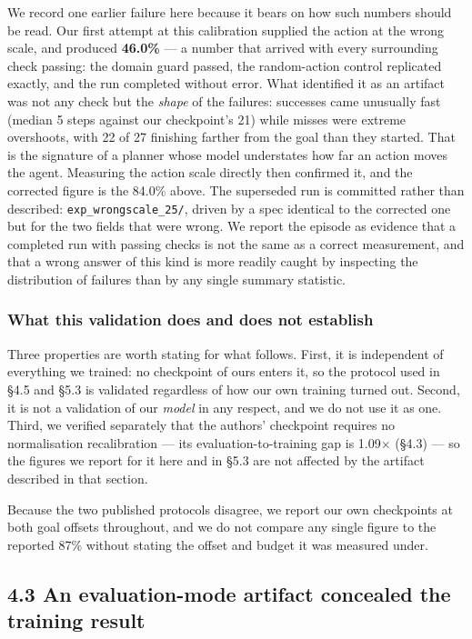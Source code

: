 \documentclass[10pt]{article}
\begin{document}
We record one earlier failure here because it bears on how such numbers should
be read. Our first attempt at this calibration supplied the action at the wrong
scale, and produced \textbf{46.0\%} --- a number that arrived with every surrounding
check passing: the domain guard passed, the random-action control replicated
exactly, and the run completed without error. What identified it as an artifact
was not any check but the \emph{shape} of the failures: successes came unusually fast (median 5 steps against our checkpoint's 21) while misses were extreme overshoots, with 22 of 27 finishing farther from the goal than they started.
That is the signature of a planner whose model understates how far an action
moves the agent. Measuring the action scale directly then confirmed it, and the corrected figure is the 84.0\% above. The superseded run is committed rather than described: \texttt{exp\_wrongscale\_25/}, driven by a spec identical to the corrected one but for the two fields that were wrong. We report the episode as evidence that a
completed run with passing checks is not the same as a correct measurement, and
that a wrong answer of this kind is more readily caught by inspecting the
distribution of failures than by any single summary statistic.

\subsubsection{What this validation does and does not establish}\label{what-this-validation-does-and-does-not-establish}

Three properties are worth stating for what follows. First, it is independent of
everything we trained: no checkpoint of ours enters it, so the protocol used in
\S{}4.5 and \S{}5.3 is validated regardless of how our own training turned out.
Second, it is not a validation of our \emph{model} in any respect, and we do not use
it as one. Third, we verified separately that the authors' checkpoint requires
no normalisation recalibration --- its evaluation-to-training gap is 1.09$\times$ (\S{}4.3)
--- so the figures we report for it here and in \S{}5.3 are not affected by the
artifact described in that section.

Because the two published protocols disagree, we report our own checkpoints at
both goal offsets throughout, and we do not compare any single figure to the
reported 87\% without stating the offset and budget it was measured under.

\subsection{4.3 An evaluation-mode artifact concealed the training result}\label{an-evaluation-mode-artifact-concealed-the-training-result}
\end{document}
